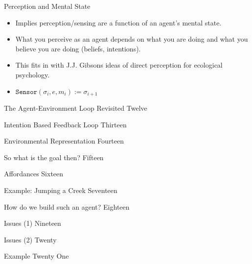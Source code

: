 \documentclass[xcolor=dvipsnames,t]{beamer}
\begin{document}
\begin{frame}{Perception and Mental State}
    \begin{itemize} 
        \item Implies perception/sensing are a function of an agent's mental
            state.
        \item What you perceive as an agent depends on what you are doing and
            what you believe you are doing (beliefs, intentions).
        \item This fits in with J.J. Gibsons ideas of direct perception for 
            ecological psychology. 
        \item $\texttt{Sensor}(\sigma_i, e, m_i) := \sigma_{i + 1}$ 
    \end{itemize} 
\end{frame} 

\begin{frame}{The Agent-Environment Loop Revisited}
Twelve
\end{frame} 

\begin{frame}{Intention Based Feedback Loop}
Thirteen
\end{frame} 

\begin{frame}{Environmental Representation} 
Fourteen
\end{frame} 

\begin{frame}{So what is the goal then?}
Fifteen
\end{frame} 

\begin{frame}{Affordances}
Sixteen
\end{frame} 

\begin{frame}{Example: Jumping a Creek} 
Seventeen
\end{frame} 

\begin{frame}{How do we build such an agent?}
Eighteen
\end{frame} 

\begin{frame}{Issues (1)}
Nineteen
\end{frame} 

\begin{frame}{Issues (2)}
Twenty
\end{frame} 

\begin{frame}{Example} 
Twenty One
\end{frame} 
\end{document}
